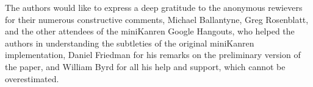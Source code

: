 The authors would like to express a deep gratitude to the anonymous rewievers for their numerous constructive comments, Michael Ballantyne, Greg Rosenblatt,
and the other attendees of the miniKanren Google Hangouts, who helped the authors in understanding the subtleties of the original miniKanren
implementation, Daniel Friedman for his remarks on the preliminary version of the paper, and William Byrd for all his help and support, which cannot be
overestimated.

